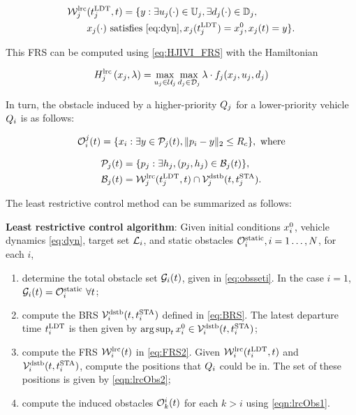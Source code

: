\begin{equation}
\label{eq:FRS2}
\begin{aligned}
&\frs_j^\text{lrc}(\ldt_j, t) = \{y: \exists \ctrl_j(\cdot)\in\cfset_j, \exists \dstb_j(\cdot) \in \dfset_j, \\
& \qquad\state_j(\cdot) \text{ satisfies \eqref{eq:dyn}}, \state_j(\ldt_j) = \state_{j}^0, \state_j(t) = y\}.
\end{aligned}
\end{equation}

This FRS can be computed using \eqref{eq:HJIVI_FRS} with the Hamiltonian

\begin{equation}
H_j^\text{lrc}\left(x_j, \lambda\right) = \max_{u_j \in \mathcal{U}_j} \max_{d_j \in \mathcal{D}_j} \lambda \cdot f_j(x_j, u_j, d_j)
\end{equation}

In turn, the obstacle induced by a higher-priority $Q_j$ for a lower-priority vehicle $Q_i$ is as follows:

\begin{equation}
\label{eqn:lrcObs1}
\ioset_i^j(t) = \{\state_i: \exists y \in \pfrs_j(t), \|\pos_i - y\|_2 \le \rc \}, \text{ where}
\end{equation}

\begin{align}
\pfrs_j(t) & = \{p_j: \exists \npos_j, (p_j, \npos_j) \in \boset_j(t) \}, \label{eqn:lrcObs2}\\
\boset_j(t) & = \frs_j^\text{lrc}(\ldt_j, t) \cap \brs_j^\text{dstb}(t, \sta_j). \label{eqn:lrcObs3}
\end{align}

The least restrictive control method can be summarized as follows:
\begin{alg}
\label{alg:lrc}
\textbf{Least restrictive control algorithm}: Given initial conditions $x_i^0$, vehicle dynamics \eqref{eq:dyn}, target set $\mathcal{L}_i$, and static obstacles $\mathcal{O}^\text{static}_i, i = 1\ldots, N$, for each $i$,
\begin{enumerate}[leftmargin = 0.5cm]
\item determine the total obstacle set $\mathcal{G}_i(t)$, given in \eqref{eq:obsseti}. In the case $i=1$, $\mathcal{G}_i(t) = \mathcal{O}^\text{static}_i ~ \forall t$;
\item compute the BRS $\mathcal{V}_i^\text{dstb}(t, t^\text{STA}_i)$ defined in \eqref{eq:BRS}. The latest departure time $t^\text{LDT}_i$ is then given by $\arg \sup_t x_{i}^0 \in \mathcal{V}_i^\text{dstb}(t, t^\text{STA}_i)$;
\item compute the FRS $\mathcal{W}_i^\text{lrc}(t)$ in \eqref{eq:FRS2}. Given $\mathcal{W}_i^\text{lrc}(t^\text{LDT}_i, t)$ and $\mathcal{V}_i^\text{dstb}(t, t^\text{STA}_i)$, compute the positions that $Q_i$ could be in. The set of these positions is given by \eqref{eqn:lrcObs2};
\item compute the induced obstacles $\mathcal{O}_k^i(t)$ for each $k>i$ using \eqref{eqn:lrcObs1}.
\end{enumerate}
\end{alg}

